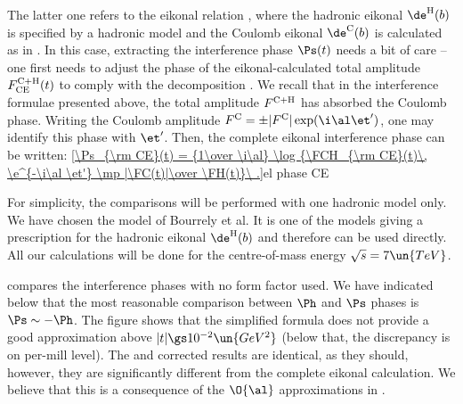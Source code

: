 \noindent The latter one refers to the eikonal relation , where the hadronic eikonal $\de^{\rm H}(b)$ is specified by a hadronic model and the Coulomb eikonal $\de^{\rm C}(b)$ is calculated as in . In this case, extracting the interference phase $\Ps(t)$ needs a bit of care -- one first needs to adjust the phase of the eikonal-calculated total amplitude $F^{\rm C+H}_{\rm CE}(t)$ to comply with the decomposition . We recall that in the interference formulae presented above, the total amplitude $F^{\rm C+H}$ has absorbed the Coulomb phase. Writing the Coulomb amplitude $\FC = \pm |\FC| \exp(\i\al\et')$, one may identify this phase with $\et'$. Then, the complete eikonal interference phase can be written:
\eqref{\Ps_{\rm CE}(t) = {1\over \i\al} \log {\FCH_{\rm CE}(t)\, \e^{-\i\al \et'} \mp |\FC(t)|\over \FH(t)}\ .}{el phase CE}

For simplicity, the comparisons will be performed with one hadronic model only. We have chosen the model of Bourrely et al. It is one of the models giving a prescription for the hadronic eikonal $\de^{\rm H}(b)$ and therefore  can be used directly. All our calculations will be done for the centre-of-mass energy $\sqrt s = 7\un{TeV}$.

 compares the interference phases with no form factor used. We have indicated below  that the most reasonable comparison between $\Ph$ and $\Ps$ phases is $\Ps \sim - \Ph$. The figure shows that the simplified \WY{} formula does not provide a good approximation above $|t| \gs 10^{-2}\un{GeV^2}$ (below that, the discrepancy is on per-mill level). The \WY{} and corrected \KL{} results are identical, as they should, however, they are significantly different from the complete eikonal calculation. We believe that this is a consequence of the $\O{\al}$ approximations in .








